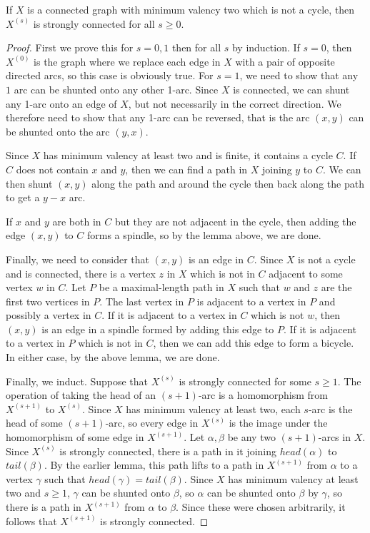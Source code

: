 \begin{theorem}
	If $X$ is a connected graph with minimum valency two which is not a cycle, then $X^{(s)}$ is strongly connected for all $s\geq 0$.
\end{theorem}
\begin{proof}
	First we prove this for $s=0,1$ then for all $s$ by induction.  If $s=0$, then $X^{(0)}$ is the graph where we replace each edge in $X$ with a pair of opposite directed arcs, so this case is obviously true.  For $s=1$, we need to show that any $1$ arc can be shunted onto any other 1-arc.  Since $X$ is connected, we can shunt any 1-arc onto an edge of $X$, but not necessarily in the correct direction.  We therefore need to show that any 1-arc can be reversed, that is the arc $(x,y)$ can be shunted onto the arc $(y,x)$.
	
	Since $X$ has minimum valency at least two and is finite, it contains a cycle $C$.  If $C$ does not contain $x$ and $y$, then we can find a path in $X$ joining $y$ to $C$.  We can then shunt $(x,y)$ along the path and around the cycle then back along the path to get a $y{-}x$ arc.
	
	If $x$ and $y$ are both in $C$ but they are not adjacent in the cycle, then adding the edge $(x,y)$  to $C$ forms a spindle, so by the lemma above, we are done.
	
	Finally, we need to consider that $(x,y)$ is an edge in $C$.  Since $X$ is not a cycle and is connected, there is a vertex $z$ in $X$ which is not in $C$ adjacent to some vertex $w$ in $C$.  Let $P$ be a maximal-length path in $X$ such that $w$ and $z$ are the first two vertices in $P$.  The last vertex in $P$ is adjacent to a vertex in $P$ and possibly a vertex in $C$.  If it is adjacent to a vertex in $C$ which is not $w$, then $(x,y)$ is an edge in a spindle formed by adding this edge to $P$.  If it is adjacent to a vertex in $P$ which is not in $C$, then we can add this edge to form a bicycle.  In either case, by the above lemma, we are done.
	
	Finally, we induct.  Suppose that $X^{(s)}$ is strongly connected for some $s\geq 1$.  The operation of taking the head of an $(s+1)$-arc is a homomorphism from $X^{(s+1)}$ to $X^{(s)}$.  Since $X$ has minimum valency at least two, each $s$-arc is the head of some $(s+1)$-arc, so every edge in $X^{(s)}$ is the image under the homomorphism of some edge in $X^{(s+1)}$.  Let $\alpha,\beta$ be any two $(s+1)$-arcs in $X$.  Since $X^{(s)}$ is strongly connected, there is a path in it joining $head(\alpha)$ to $tail(\beta)$.  By the earlier lemma, this path lifts to a path in $X^{(s+1)}$ from $\alpha$ to a vertex $\gamma$ such that $head(\gamma)=tail(\beta)$.  Since $X$ has minimum valency at least two  and $s\geq 1$, $\gamma$ can be shunted onto $\beta$, so $\alpha$ can be shunted onto $\beta$ by $\gamma$, so there is a path in $X^{(s+1)}$ from $\alpha$ to $\beta$.  Since these were chosen arbitrarily, it follows that $X^{(s+1)}$ is strongly connected.


\end{proof}

